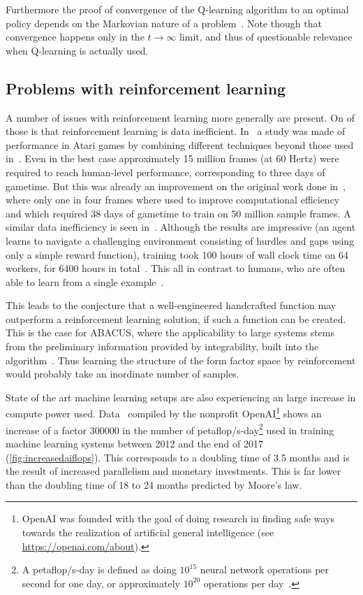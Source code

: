 \documentclass[11pt, a4paper]{report} %
\begin{document}
Furthermore the proof of convergence of the Q-learning algorithm to an optimal policy depends on the Markovian nature of a problem~\cite{watkins92_q_learn}.
Note though that convergence happens only in the \(t\to\infty\) limit, and thus of questionable relevance when Q-learning is actually used.


\subsection{Problems with reinforcement learning}


A number of issues with reinforcement learning more generally are present.
On of those is that reinforcement learning is data inefficient.
In~\cite{1710.02298} a study was made of performance in Atari games by combining different techniques beyond those used in~\cite{mnih13_playin_atari_with_deep_reinf_learn,mnih15_human_level_contr_throug_deep_reinf_learn}.
Even in the best case approximately 15 million frames (at 60 Hertz) were required to reach human-level performance, corresponding to three days of gametime.
But this was already an improvement on the original work done in~\cite{mnih15_human_level_contr_throug_deep_reinf_learn}, where only one in four frames where used to improve computational efficiency and which required 38 days of gametime to train on 50 million sample frames.
A similar data inefficiency is seen in~\cite{heess17_emerg_locom_behav_rich_envir}.
Although the results are impressive (an agent learns to navigate a challenging environment consisting of hurdles and gaps using only a simple reward function), training took 100 hours of wall clock time on 64 workers, for 6400 hours in total~\cite[Figure 1]{heess17_emerg_locom_behav_rich_envir}.
This all in contrast to humans, who are often able to learn from a single example~\cite{marcus18_deep_learn}.

This leads to the conjecture that a well-engineered handcrafted function may outperform a reinforcement learning solution, if such a function can be created.
This is the case for ABACUS, where the applicability to large systems stems from the preliminary information provided by integrability, built into the algorithm~\cite{Caux2009}.
Thus learning the structure of the form factor space by reinforcement would probably take an inordinate number of samples.

State of the art machine learning setups are also experiencing an large increase in compute power used.
Data~\cite{amodei2018} compiled by the nonprofit OpenAI\footnote{OpenAI was founded with the goal of doing research in finding safe ways towards the realization of artificial general intelligence (see \href{https://openai.com/about}{https://openai.com/about}).} shows an increase of a factor 300000 in the number of petaflop/s-day\footnote{A petaflop/s-day is defined as doing $10^{15}$ neural network operations per second for one day, or approximately $10^{20}$ operations per day~\cite{amodei2018}.} used in training machine learning systems between 2012 and the end of 2017 (\cref{fig:increasedaiflops}). 
This corresponds to a doubling time of 3.5 months and is the result of increased parallelism and monetary investments.
This is far lower than the doubling time of 18 to 24 months predicted by Moore's law.
\end{document}
